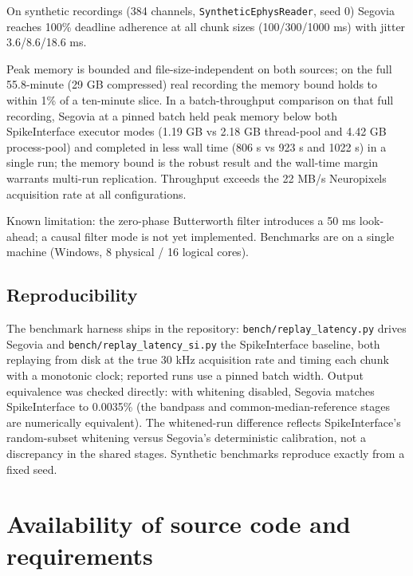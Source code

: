 \documentclass[a4paper,num-refs,gigabyte]{oup-contemporary}
\begin{document}
On synthetic recordings (384 channels, \texttt{SyntheticEphysReader}, seed 0) Segovia reaches 100\% deadline adherence at all chunk sizes (100/300/1000 ms) with jitter 3.6/8.6/18.6 ms.

Peak memory is bounded and file-size-independent on both sources; on the full 55.8-minute (29 GB compressed) real recording the memory bound holds to within 1\% of a ten-minute slice. In a batch-throughput comparison on that full recording, Segovia at a pinned batch held peak memory below both SpikeInterface executor modes (1.19 GB vs 2.18 GB thread-pool and 4.42 GB process-pool) and completed in less wall time (806 s vs 923 s and 1022 s) in a single run; the memory bound is the robust result and the wall-time margin warrants multi-run replication. Throughput exceeds the 22 MB/s Neuropixels acquisition rate at all configurations.

Known limitation: the zero-phase Butterworth filter introduces a 50 ms look-ahead; a causal filter mode is not yet implemented. Benchmarks are on a single machine (Windows, 8 physical / 16 logical cores).

\subsection{Reproducibility}

The benchmark harness ships in the repository: \texttt{bench/replay\_latency.py} drives Segovia and \texttt{bench/replay\_latency\_si.py} the SpikeInterface baseline, both replaying from disk at the true 30 kHz acquisition rate and timing each chunk with a monotonic clock; reported runs use a pinned batch width. Output equivalence was checked directly: with whitening disabled, Segovia matches SpikeInterface to 0.0035\% (the bandpass and common-median-reference stages are numerically equivalent). The whitened-run difference reflects SpikeInterface's random-subset whitening versus Segovia's deterministic calibration, not a discrepancy in the shared stages. Synthetic benchmarks reproduce exactly from a fixed seed.

\section{Availability of source code and requirements}
\end{document}
